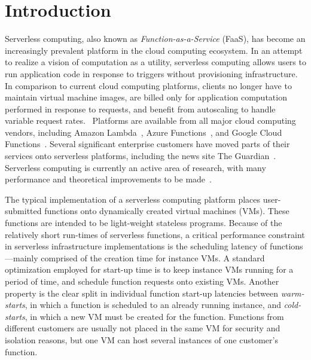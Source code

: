 \section{Introduction} \label{sec:intro}

 Serverless computing, also known as
\emph{Function-as-a-Service} (FaaS), has become an increasingly prevalent
platform in the cloud computing ecosystem. In an attempt to realize a vision of
computation as a utility, serverless computing allows users to run application
code in response to triggers without provisioning infrastructure. In comparison
to current cloud computing platforms, clients no longer have to maintain
virtual machine images, are billed only for application computation performed
in response to requests, and benefit from autoscaling to handle variable
request rates.~\cite{berkeley-serverless} Platforms are available from all major
cloud computing vendors, including Amazon Lambda~\cite{lambda}, Azure
Functions~\cite{azure-cf}, and Google Cloud Functions~\cite{gcf}. Several
significant enterprise customers have moved parts of their services onto
serverless platforms, including the news site The Guardian~\cite{guardian}.
Serverless computing is currently an active area of research, with many
performance and theoretical improvements to be
made~\cite{peeking}\cite{trilemma}\cite{steps-back}.

 The typical implementation of a
serverless computing platform places user-submitted functions onto dynamically
created virtual machines (VMs). These functions are intended to be light-weight
stateless programs. Because of the relatively short run-times of serverless
functions, a critical performance constraint in serverless infrastructure
implementations is the scheduling latency of functions---mainly comprised of
the creation time for instance VMs. A standard optimization employed for
start-up time is to keep instance VMs running for a period of time, and
schedule function requests onto existing VMs. Another property is the clear
split in individual function start-up latencies between \emph{warm-starts}, in
which a function is scheduled to an already running instance, and
\emph{cold-starts}, in which a new VM must be created for the function.
Functions from different customers are usually not placed in the same VM for
security and isolation reasons, but one VM can host several instances of one
customer's function.

